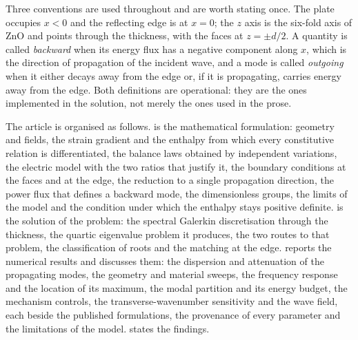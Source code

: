 Three conventions are used throughout and are worth stating once.  The plate
occupies $x<0$ and the reflecting edge is at $x=0$; the $z$ axis is the
six-fold axis of ZnO and points through the thickness, with the faces at
$z=\pm d/2$.  A quantity is called \emph{backward} when its energy flux has a
negative component along $x$, which is the direction of propagation of the
incident wave, and a mode is called \emph{outgoing} when it either decays away
from the edge or, if it is propagating, carries energy away from the edge.  Both
definitions are operational: they are the ones implemented in the solution, not
merely the ones used in the prose.

The article is organised as follows.   is the mathematical
formulation: geometry and fields, the strain gradient and the enthalpy from which
every constitutive relation is differentiated, the balance laws obtained by
independent variations, the electric model with the two ratios that justify it,
the boundary conditions at the faces and at the edge, the reduction to a single
propagation direction, the power flux that defines a backward mode, the
dimensionless groups, the limits of the model and the condition under which the
enthalpy stays positive definite.   is the solution of the
problem: the spectral Galerkin discretisation through the thickness, the quartic
eigenvalue problem it produces, the two routes to that problem, the classification
of roots and the matching at the edge.   reports the numerical
results and discusses them: the dispersion and attenuation of the propagating
modes, the geometry and material sweeps, the frequency response and the location
of its maximum, the modal partition and its energy budget, the mechanism controls,
the transverse-wavenumber sensitivity and the wave field, each beside the
published formulations, the provenance of every parameter and the limitations of
the model.   states the findings.
